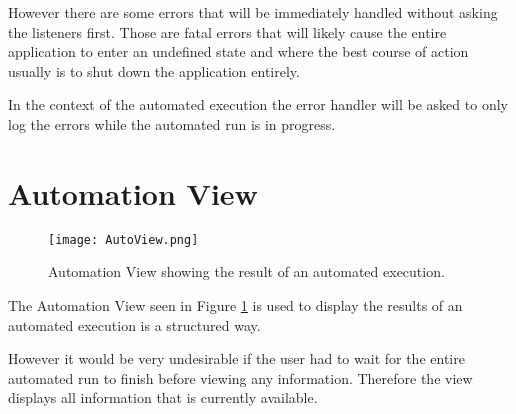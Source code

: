 However there are some errors that will be immediately handled without asking the
listeners first. Those are fatal errors that will likely cause the entire application
to enter an undefined state and where the best course of action usually is to shut down
the application entirely.

In the context of the automated execution the error handler will be asked to only log
the errors while the automated run is in progress.

\section{Automation View}
\label{section:AutoView}
\begin{figure}
  \centering
  \texttt{[image: AutoView.png]}
  \caption[Automation View showing the result of an automated execution.]%
  {Automation View showing the result of an automated execution.\protect}
  \label{fig:AutoView}
\end{figure}
The Automation View seen in Figure \ref{fig:AutoView} is used to display the results of an automated execution is a structured
way.

However it would be very undesirable if the user had to wait for the entire automated run
to finish before viewing any information. Therefore the view displays all information
that is currently available. 

